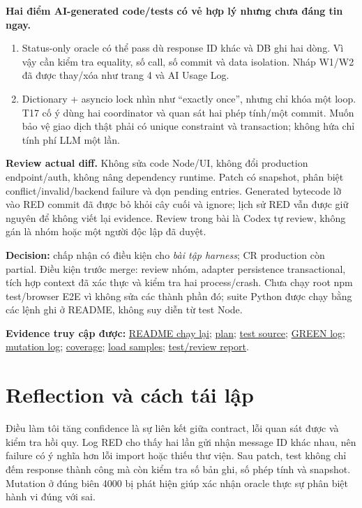 \documentclass[11pt,a4paper]{article}
\newcommand{\Repo}{https://github.com/doandinhlinh25/thanh-tam-tam-linh}
\newcommand{\Evidence}{362703817e2d01a7915a076b954fcbf3038771b5}
\newcommand{\fref}[2]{\href{\Repo/blob/\Evidence/#1}{#2}}
\begin{document}
\textbf{Hai điểm AI-generated code/tests có vẻ hợp lý nhưng chưa đáng tin ngay.}
\begin{enumerate}
\item Status-only oracle có thể pass dù response ID khác và DB ghi hai dòng. Vì vậy cần kiểm tra equality, số call, số commit và data isolation. Nháp W1/W2 đã được thay/xóa như trang 4 và AI Usage Log.
\item Dictionary + asyncio lock nhìn như ``exactly once'', nhưng chỉ khóa một loop. T17 cố ý dùng hai coordinator và quan sát hai phép tính/một commit. Muốn bảo vệ giao dịch thật phải có unique constraint và transaction; không hứa chỉ tính phí LLM một lần.
\end{enumerate}

\textbf{Review actual diff.} Không sửa code Node/UI, không đổi production endpoint/auth, không nâng dependency runtime. Patch có snapshot, phân biệt conflict/invalid/backend failure và dọn pending entries. Generated bytecode lỡ vào RED commit đã được bỏ khỏi cây cuối và ignore; lịch sử RED vẫn được giữ nguyên để không viết lại evidence. Review trong bài là Codex tự review, không gán là nhóm hoặc một người độc lập đã duyệt.

\textbf{Decision:} chấp nhận có điều kiện cho \emph{bài tập harness}; CR production còn partial. Điều kiện trước merge: review nhóm, adapter persistence transactional, tích hợp context đã xác thực và kiểm tra hai process/crash. Chưa chạy root npm test/browser E2E vì không sửa các thành phần đó; suite Python được chạy bằng các lệnh ghi ở README, không suy diễn từ test Node.

\textbf{Evidence truy cập được:} \fref{experiments/vt002/README.md}{README chạy lại}; \fref{docs/plans/2026-11-08/vt002-idempotency.md}{plan}; \fref{experiments/vt002/test_idempotency.py}{test source}; \fref{experiments/vt002/evidence/green.log}{GREEN log}; \fref{experiments/vt002/evidence/mutation.log}{mutation log}; \fref{experiments/vt002/evidence/coverage.json}{coverage}; \fref{experiments/vt002/evidence/load.json}{load samples}; \fref{docs/reports/2026-11-08/2026-11-08-vt002-test-review.md}{test/review report}.

\newpage
\section{Reflection và cách tái lập}
Điều làm tôi tăng confidence là sự liên kết giữa contract, lỗi quan sát được và kiểm tra hồi quy. Log RED cho thấy hai lần gửi nhận message ID khác nhau, nên failure có ý nghĩa hơn lỗi import hoặc thiếu thư viện. Sau patch, test không chỉ đếm response thành công mà còn kiểm tra số bản ghi, số phép tính và snapshot. Mutation ở đúng biên 4000 bị phát hiện giúp xác nhận oracle thực sự phân biệt hành vi đúng với sai.
\end{document}
